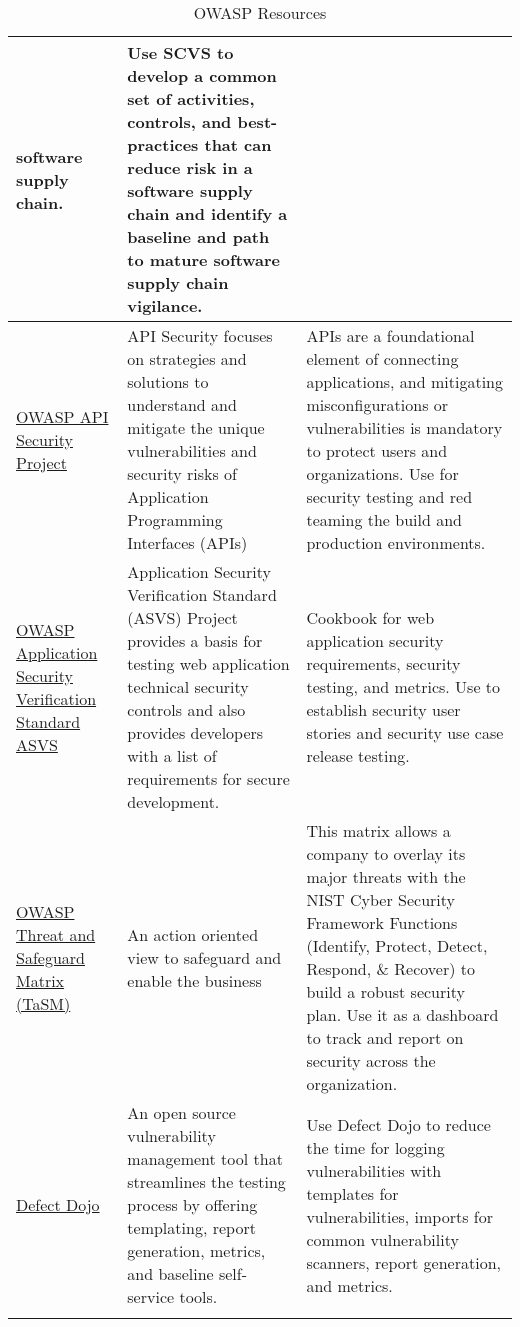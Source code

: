 \begin{longtable}[c]{|p{}|p{}|p{}|}
  software supply chain. &
  Use SCVS to develop a common set of activities, controls, and best-practices
  that can reduce risk in a software supply chain and identify a baseline and
  path to mature software supply chain vigilance. \\
  \hline
  \href{https://owasp.org/www-project-api-security/}{OWASP API Security Project } &
  API Security focuses on strategies and solutions to understand and mitigate
  the unique vulnerabilities and security risks of Application Programming
  Interfaces (APIs) &
  APIs are a foundational element of connecting applications, and mitigating
  misconfigurations or vulnerabilities is mandatory to protect users and
  organizations. Use for security testing and red teaming the build and
  production environments. \\
  \hline
  \href{https://owasp.org/www-project-application-security-verification-standard/}{OWASP Application Security Verification Standard ASVS} &
  Application Security Verification Standard (ASVS) Project provides a basis
  for testing web application technical security controls and also provides
  developers with a list of requirements for secure development. &
  Cookbook for web application security requirements, security testing, and
  metrics. Use to establish security user stories and security use case release
  testing. \\
  \hline
  \href{https://owasp.org/www-project-threat-and-safeguard-matrix/}{OWASP Threat and Safeguard Matrix (TaSM)} &
  An action oriented view to safeguard and enable the business &
  This matrix allows a company to overlay its major threats with the NIST Cyber
  Security Framework Functions (Identify, Protect, Detect, Respond, \& Recover)
  to build a robust security plan. Use it as a dashboard to track and report on
  security across the organization. \\
  \hline
  \href{https://www.defectdojo.com/}{Defect Dojo} &
  An open source vulnerability management tool that streamlines the testing
  process by offering templating, report generation, metrics, and baseline
  self-service tools. &
  Use Defect Dojo to reduce the time for logging vulnerabilities with templates
  for vulnerabilities, imports for common vulnerability scanners, report
  generation, and metrics. \\
  \hline
  \caption{OWASP Resources}
  \label{tab:owasp-resources}
\end{longtable}
